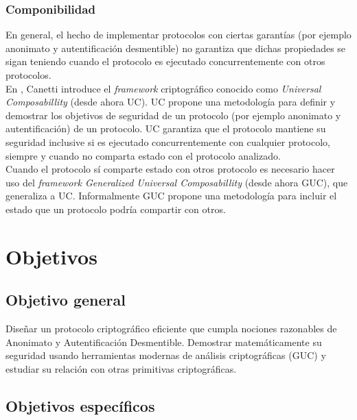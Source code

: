 \subsubsection{Componibilidad}
En general, el hecho de implementar protocolos con ciertas garantías (por ejemplo ano\-ni\-ma\-to y
autentificación desmentible) no garantiza que dichas propiedades se sigan teniendo cuando
el protocolo es ejecutado concurrentemente con otros protocolos.\\
En \cite{conf/focs/Canetti01}, Canetti introduce el \textit{framework} criptográfico conocido
como \textit{Universal Composabillity} (desde ahora UC). UC propone una metodología para definir y
demostrar los objetivos de seguridad de un protocolo (por ejemplo anonimato y autentificación)
de un protocolo. UC garantiza que el protocolo mantiene su seguridad inclusive
si es ejecutado concurrentemente con cualquier protocolo, siempre y cuando no comparta estado
con el protocolo analizado.\\
Cuando el protocolo sí comparte estado con otros protocolo es necesario hacer uso del
\textit{framework Generalized Universal Composabillity} (desde ahora GUC), que generaliza a UC.
Informalmente GUC propone una metodología para incluir el estado que un protocolo podría compartir
con otros.

\section{Objetivos}

\subsection{Objetivo general}
Diseñar un protocolo criptográfico eficiente que cumpla nociones razonables
de Anonimato y Autentificación Desmentible. Demostrar matemáticamente su
seguridad usando herramientas modernas de análisis criptográficas (GUC) y
estudiar su relación con otras primitivas criptográficas.

\subsection{Objetivos específicos}

